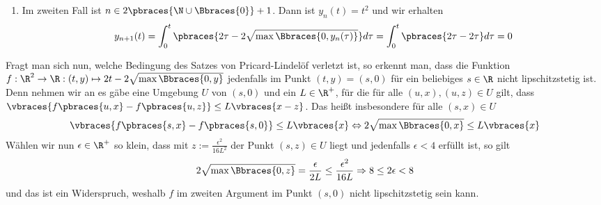\begin{solution}
\begin{enumerate}[label = \alph*)]
\begin{enumerate}[label = \roman*)]
            \item Im zweiten Fall ist $n \in 2 \pbraces{\N \cup \Bbraces{0}} + 1$. Dann ist $y_n(t) = t^2$ und wir erhalten
            \begin{align*}
                y_{n+1}(t) = \int_0^t \pbraces{2\tau - 2 \sqrt{\max\Bbraces{0, y_n(\tau)}}} d\tau = \int_0^t \pbraces{2\tau - 2\tau} d\tau = 0
            \end{align*}
        \end{enumerate}
        Fragt man sich nun, welche Bedingung des Satzes von Pricard-Lindelöf verletzt ist, so erkennt man, dass die Funktion $f: \R^2 \to \R: (t,y) \mapsto 2t - 2\sqrt{\max\Bbraces{0,y}}$ jedenfalls im Punkt $(t,y) = (s,0)$ für ein beliebiges $s \in \R$ nicht lipschitzstetig ist. Denn nehmen wir an es gäbe eine Umgebung $U$ von $(s,0)$ und ein $L \in \R^+$, für die für alle $(u,x), (u,z) \in U$ gilt, dass $\vbraces{f\pbraces{u,x}- f\pbraces{u,z}} \leq L\vbraces{x - z}$. Das heißt insbesondere für alle $(s,x) \in U$
        \begin{align*}
            \vbraces{f\pbraces{s,x}- f\pbraces{s,0}} \leq L\vbraces{x} \Leftrightarrow 2\sqrt{\max\Bbraces{0, x}} \leq L\vbraces{x}
        \end{align*}
        Wählen wir nun $\epsilon \in \R^+$ so klein, dass mit $z := \frac{\epsilon^2}{16L^2}$ der Punkt $(s, z) \in U$ liegt und jedenfalls $\epsilon < 4$ erfüllt ist, so gilt
        \begin{align*}
            2\sqrt{\max\Bbraces{0, z}} = \frac{\epsilon}{2L} \leq \frac{\epsilon^2}{16 L} \Rightarrow 8 \leq 2\epsilon < 8
        \end{align*}
        und das ist ein Widerspruch, weshalb $f$ im zweiten Argument im Punkt $(s,0)$ nicht lipschitzstetig sein kann.
    \end{enumerate}

\end{solution}

